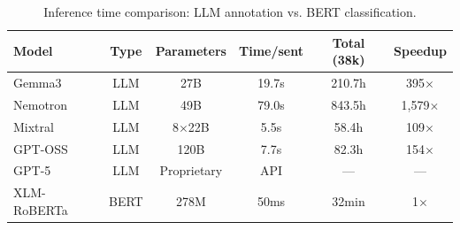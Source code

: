 \begin{table}[h!]
\centering
\caption{Inference time comparison: LLM annotation vs. BERT classification.}
\label{tab:efficiency}
\begin{tabular}{lccccc}
\toprule
\textbf{Model} & \textbf{Type} & \textbf{Parameters} & \textbf{Time/sent} & \textbf{Total (38k)} & \textbf{Speedup} \\
\midrule
Gemma3 & LLM & 27B & 19.7s & 210.7h & 395$\times$ \\
Nemotron & LLM & 49B & 79.0s & 843.5h & 1,579$\times$ \\
Mixtral & LLM & 8$\times$22B & 5.5s & 58.4h & 109$\times$ \\
GPT-OSS & LLM & 120B & 7.7s & 82.3h & 154$\times$ \\
GPT-5 & LLM & Proprietary & API & — & — \\
\midrule
XLM-RoBERTa & BERT & 278M & 50ms & 32min & 1$\times$ \\
\bottomrule
\end{tabular}
\end{table}
